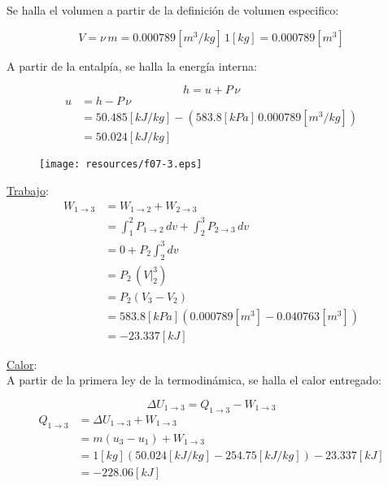 \documentclass[letter,11pt]{article}
\begin{document}
\begin{enumerate}
Se halla el volumen a partir de la definición de volumen especifico:

\begin{equation*}
    V = \nu\,m = 0.000789[m^3/kg]\,1[kg] = 0.000789[m^3]
\end{equation*}

A partir de la entalpía, se halla la energía interna:

\begin{equation*}
    h = u + P\,\nu
\end{equation*}
\begin{equation*}
    \begin{split}
        u &= h - P\,\nu \\
            &= 50.485[kJ/kg] - (583.8[kPa]\,0.000789[m^3/kg]) \\
            &= 50.024[kJ/kg]
    \end{split}
\end{equation*}

\begin{figure}[H]
\centering
\texttt{[image: resources/f07-3.eps]}
\end{figure}

\underline{Trabajo}: \\
\begin{equation*}
    \begin{split}
    W_{1\rightarrow 3} &= W_{1\rightarrow 2} + W_{2\rightarrow 3} \\
                       &= \int_1^2 P_{1\rightarrow 2}\,dv
                          + \int_2^3 P_{2\rightarrow 3}\,dv \\
                       &= 0 + P_2 \int_2^3 dv \\
                       &= P_2\,(V\Biggr|_2^3) \\
                       &= P_2(V_3-V_2) \\
                       &= 583.8[kPa](0.000789[m^3]-0.040763[m^3]) \\
                       &= -23.337[kJ]
    \end{split}
\end{equation*}

\underline{Calor}: \\
A partir de la primera ley de la termodinámica, se halla el calor entregado:

\begin{equation*}
    \Delta U_{1\rightarrow 3} = Q_{1\rightarrow 3} - W_{1\rightarrow 3}
\end{equation*}
\begin{equation*}
    \begin{split}
        Q_{1\rightarrow 3} &= \Delta U_{1\rightarrow 3} + W_{1\rightarrow 3} \\
                           &= m(u_3 - u_1) + W_{1\rightarrow 3} \\
                           &= 1[kg](50.024[kJ/kg]-254.75[kJ/kg])-23.337[kJ] \\
                           &= -228.06[kJ]
    \end{split}
\end{equation*}


\end{enumerate}
\end{document}
